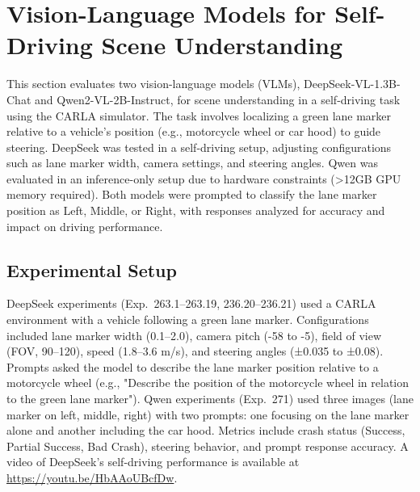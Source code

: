 

\section{Vision-Language Models for Self-Driving Scene Understanding}
\label{sec:vlm_scene_understanding}

This section evaluates two vision-language models (VLMs), DeepSeek-VL-1.3B-Chat and Qwen2-VL-2B-Instruct, for scene understanding in a self-driving task using the CARLA simulator. The task involves localizing a green lane marker relative to a vehicle's position (e.g., motorcycle wheel or car hood) to guide steering. DeepSeek was tested in a self-driving setup, adjusting configurations such as lane marker width, camera settings, and steering angles. Qwen was evaluated in an inference-only setup due to hardware constraints (>12GB GPU memory required). Both models were prompted to classify the lane marker position as Left, Middle, or Right, with responses analyzed for accuracy and impact on driving performance.


\subsection{Experimental Setup}
DeepSeek experiments (Exp.~263.1--263.19, 236.20--236.21) used a CARLA environment with a vehicle following a green lane marker. Configurations included lane marker width (0.1--2.0), camera pitch (-58 to -5), field of view (FOV, 90--120), speed (1.8--3.6 m/s), and steering angles (±0.035 to ±0.08). Prompts asked the model to describe the lane marker position relative to a motorcycle wheel (e.g., "Describe the position of the motorcycle wheel in relation to the green lane marker"). Qwen experiments (Exp.~271) used three images (lane marker on left, middle, right) with two prompts: one focusing on the lane marker alone and another including the car hood. Metrics include crash status (Success, Partial Success, Bad Crash), steering behavior, and prompt response accuracy. A video of DeepSeek's self-driving performance is available at \url{https://youtu.be/HbAAoUBcfDw}.

